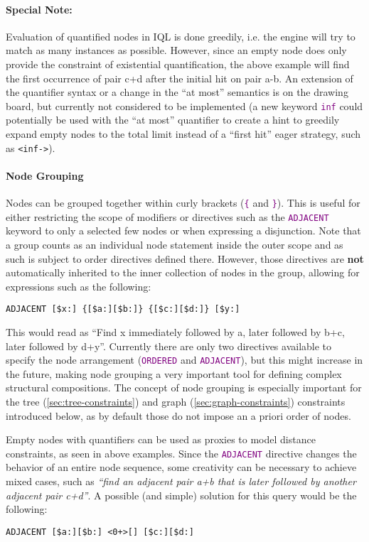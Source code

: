 \documentclass[11pt,a4paper,portrait]{article}
\newcommand{\iql}{IQL\xspace}
\newcommand{\keyword}[1]{\textcolor{purple}{\texttt{#1}}}
\begin{document}
\paragraph{Special Note:}
\noindent Evaluation of quantified nodes in \iql is done greedily, i.e. the engine will try to match as many instances as possible.
However, since an empty node does only provide the constraint of existential quantification, the above example will find the first occurrence of pair c+d after the initial hit on pair a-b.
An extension of the quantifier syntax or a change in the ``at most'' semantics is on the drawing board, but currently not considered to be implemented (a new keyword \keyword{inf} could potentially be used with the ``at most'' quantifier to create a hint to greedily expand empty nodes to the total limit instead of a ``first hit'' eager strategy, such as \texttt{<inf->}).

\paragraph{Node Grouping}
\noindent Nodes can be grouped together within curly brackets (\keyword{\{} and \keyword{\}}).
This is useful for either restricting the scope of modifiers or directives such as the \keyword{ADJACENT} keyword to only a selected few nodes or when expressing a disjunction.
Note that a group counts as an individual node statement inside the outer scope and as such is subject to order directives defined there.
However, those directives are \textbf{not} automatically inherited to the inner collection of nodes in the group, allowing for expressions such as the following:
\begin{verbatim}
ADJACENT [$x:] {[$a:][$b:]} {[$c:][$d:]} [$y:]
\end{verbatim}
This would read as ``Find x immediately followed by a, later followed by b+c, later followed by d+y''.
Currently there are only two directives available to specify the node arrangement (\keyword{ORDERED} and \keyword{ADJACENT}), but this might increase in the future, making node grouping a very important tool for defining complex structural compositions.
The concept of node grouping is especially important for the tree (\ref{sec:tree-constraints}) and graph (\ref{sec:graph-constraints}) constraints introduced below, as by default those do not impose an a priori order of nodes.

Empty nodes with quantifiers can be used as proxies to model distance constraints, as seen in above examples.
Since the \keyword{ADJACENT} directive changes the behavior of an entire node sequence, some creativity can be necessary to achieve mixed cases, such as \textit{``find an adjacent pair a+b that is later followed by another adjacent pair c+d''}.
A possible (and simple) solution for this query would be the following:
\begin{verbatim}
ADJACENT [$a:][$b:] <0+>[] [$c:][$d:]
\end{verbatim}
\end{document}

